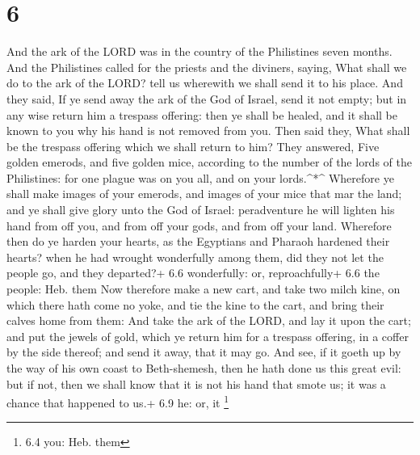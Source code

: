 \hypertarget{section-5}{%
\section{6}\label{section-5}}

 And the ark of the LORD was in the country of the
Philistines seven months.  And the Philistines called for
the priests and the diviners, saying, What shall we do to the ark of the
LORD? tell us wherewith we shall send it to his place.  And
they said, If ye send away the ark of the God of Israel, send it not
empty; but in any wise return him a trespass offering: then ye shall be
healed, and it shall be known to you why his hand is not removed from
you.  Then said they, What shall be the trespass offering
which we shall return to him? They answered, Five golden emerods, and
five golden mice, according to the number of the lords of the
Philistines: for one plague was on you all, and on your lords.\^{}*\^{}
 Wherefore ye shall make images of your emerods, and images
of your mice that mar the land; and ye shall give glory unto the God of
Israel: peradventure he will lighten his hand from off you, and from off
your gods, and from off your land.  Wherefore then do ye
harden your hearts, as the Egyptians and Pharaoh hardened their hearts?
when he had wrought wonderfully among them, did they not let the people
go, and they departed?+ 6.6 wonderfully: or, reproachfully+ 6.6 the
people: Heb. them  Now therefore make a new cart, and take
two milch kine, on which there hath come no yoke, and tie the kine to
the cart, and bring their calves home from them:  And take
the ark of the LORD, and lay it upon the cart; and put the jewels of
gold, which ye return him for a trespass offering, in a coffer by the
side thereof; and send it away, that it may go.  And see, if
it goeth up by the way of his own coast to Beth-shemesh, then he hath
done us this great evil: but if not, then we shall know that it is not
his hand that smote us; it was a chance that happened to us.+ 6.9 he:
or, it \footnote{6.4 you: Heb. them}

